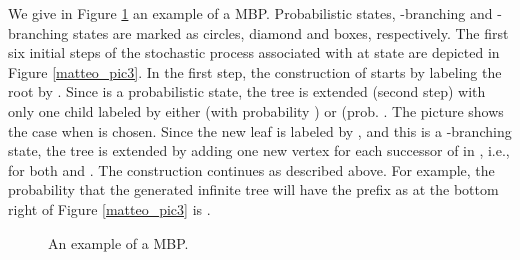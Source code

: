 We give in Figure \ref{matteo_pic1} an example of a MBP. Probabilistic states, -branching and -branching states are marked as circles, diamond and boxes, respectively.  The first six initial steps of the stochastic process associated with  at state  are depicted in Figure \ref{matteo_pic3}.
In the first step, the construction of  starts by labeling the root by . Since  is a probabilistic state, the tree is extended (second step) with only one child labeled by either  (with probability ) or  (prob. . The picture  shows the case when  is chosen. Since the new leaf is labeled by , and this is a -branching state, the tree is extended by adding one new vertex for each successor of  in , i.e., for both  and . The construction continues as described above. For example, the probability that the generated infinite tree will have the prefix as at the bottom right of Figure \ref{matteo_pic3} is .
\begin{figure}[H] 
\centering
{}



\caption{An example of a MBP.}
\label{matteo_pic1}
\end{figure}
 
